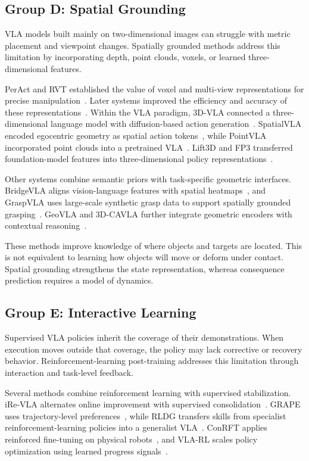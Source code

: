 \documentclass{ieeeaccess}
\begin{document}
\subsection{Group D: Spatial Grounding}
\label{sec:groupD}

VLA models built mainly on two-dimensional images can struggle with metric placement and viewpoint changes. Spatially grounded methods address this limitation by incorporating depth, point clouds, voxels, or learned three-dimensional features.

PerAct and RVT established the value of voxel and multi-view representations for precise manipulation~\cite{peract,rvt}. Later systems improved the efficiency and accuracy of these representations~\cite{rvt2,act3d}. Within the VLA paradigm, 3D-VLA connected a three-dimensional language model with diffusion-based action generation~\cite{threedvla}. SpatialVLA encoded egocentric geometry as spatial action tokens~\cite{spatialvla}, while PointVLA incorporated point clouds into a pretrained VLA~\cite{pointvla}. Lift3D and FP3 transferred foundation-model features into three-dimensional policy representations~\cite{lift3d,fp3}.

Other systems combine semantic priors with task-specific geometric interfaces. BridgeVLA aligns vision-language features with spatial heatmaps~\cite{bridgevla}, and GraspVLA uses large-scale synthetic grasp data to support spatially grounded grasping~\cite{graspvla}. GeoVLA and 3D-CAVLA further integrate geometric encoders with contextual reasoning~\cite{geovla,cavla}.

These methods improve knowledge of where objects and targets are located. This is not equivalent to learning how objects will move or deform under contact. Spatial grounding strengthens the state representation, whereas consequence prediction requires a model of dynamics.

\subsection{Group E: Interactive Learning}
\label{sec:groupE}

Supervised VLA policies inherit the coverage of their demonstrations. When execution moves outside that coverage, the policy may lack corrective or recovery behavior. Reinforcement-learning post-training addresses this limitation through interaction and task-level feedback.

Several methods combine reinforcement learning with supervised stabilization. iRe-VLA alternates online improvement with supervised consolidation~\cite{irevla}. GRAPE uses trajectory-level preferences~\cite{grape}, while RLDG transfers skills from specialist reinforcement-learning policies into a generalist VLA~\cite{rldg}. ConRFT applies reinforced fine-tuning on physical robots~\cite{conrft}, and VLA-RL scales policy optimization using learned progress signals~\cite{vlarl}.
\end{document}
